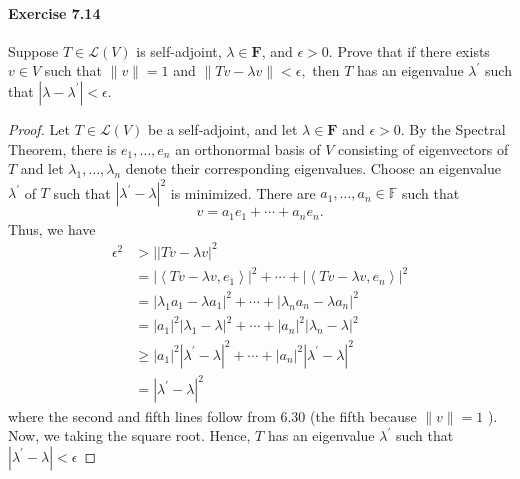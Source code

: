 \documentclass{article}
\theoremstyle{definition}
\begin{document}
\paragraph{Exercise 7.14} Suppose $T \in \mathcal{L}(V)$ is self-adjoint, $\lambda \in \mathbf{F}$, and $\epsilon>0$. Prove that if there exists $v \in V$ such that $\|v\|=1$ and $\|T v-\lambda v\|<\epsilon,$ then $T$ has an eigenvalue $\lambda^{\prime}$ such that $\left|\lambda-\lambda^{\prime}\right|<\epsilon$.
\begin{proof}
    Let $T \in \mathcal{L}(V)$ be a self-adjoint, and let $\lambda \in \mathbf{F}$ and $\epsilon>0$.
By the Spectral Theorem, there is $e_1, \ldots, e_n$ an orthonormal basis of $V$ consisting of eigenvectors of $T$ and let $\lambda_1, \ldots, \lambda_n$ denote their corresponding eigenvalues.
Choose an eigenvalue $\lambda^{\prime}$ of $T$ such that $\left|\lambda^{\prime}-\lambda\right|^2$ is minimized.
There are $a_1, \ldots, a_n \in \mathbb{F}$ such that
$$
v=a_1 e_1+\cdots+a_n e_n .
$$
Thus, we have
$$
\begin{aligned}
\epsilon^2 & >|| T v-\left.\lambda v\right|^2 \\
& =\left|\left\langle T v-\lambda v, e_1\right\rangle\right|^2+\cdots+\left|\left\langle T v-\lambda v, e_n\right\rangle\right|^2 \\
& =\left|\lambda_1 a_1-\lambda a_1\right|^2+\cdots+\left|\lambda_n a_n-\lambda a_n\right|^2 \\
& =\left|a_1\right|^2\left|\lambda_1-\lambda\right|^2+\cdots+\left|a_n\right|^2\left|\lambda_n-\lambda\right|^2 \\
& \geq\left|a_1\right|^2\left|\lambda^{\prime}-\lambda\right|^2+\cdots+\left|a_n\right|^2\left|\lambda^{\prime}-\lambda\right|^2 \\
& =\left|\lambda^{\prime}-\lambda\right|^2
\end{aligned}
$$
where the second and fifth lines follow from $6.30$ (the fifth because $\|v\|=1$ ). Now, we taking the square root.
Hence, $T$ has an eigenvalue $\lambda^{\prime}$ such that $\left|\lambda^{\prime}-\lambda\right|<\epsilon$
\end{proof}
\end{document}

